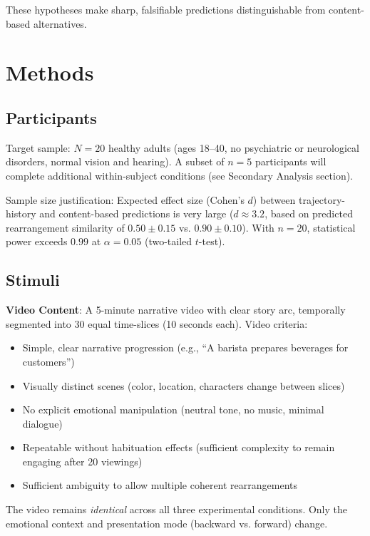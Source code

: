 \documentclass[12pt,a4paper]{article}
\theoremstyle{definition}
\begin{document}
These hypotheses make sharp, falsifiable predictions distinguishable from content-based alternatives.

\section{Methods}

\subsection{Participants}

Target sample: $N = 20$ healthy adults (ages 18--40, no psychiatric or neurological disorders, normal vision and hearing). A subset of $n = 5$ participants will complete additional within-subject conditions (see Secondary Analysis section).

Sample size justification: Expected effect size (Cohen's $d$) between trajectory-history and content-based predictions is very large ($d \approx 3.2$, based on predicted rearrangement similarity of $0.50 \pm 0.15$ vs. $0.90 \pm 0.10$). With $n = 20$, statistical power exceeds $0.99$ at $\alpha = 0.05$ (two-tailed $t$-test).

\subsection{Stimuli}

\textbf{Video Content}: A 5-minute narrative video with clear story arc, temporally segmented into 30 equal time-slices (10 seconds each). Video criteria:
\begin{itemize}
  \item Simple, clear narrative progression (e.g., ``A barista prepares beverages for customers'')
  \item Visually distinct scenes (color, location, characters change between slices)
  \item No explicit emotional manipulation (neutral tone, no music, minimal dialogue)
  \item Repeatable without habituation effects (sufficient complexity to remain engaging after 20 viewings)
  \item Sufficient ambiguity to allow multiple coherent rearrangements
\end{itemize}

The video remains \textit{identical} across all three experimental conditions. Only the emotional context and presentation mode (backward vs. forward) change.
\end{document}
